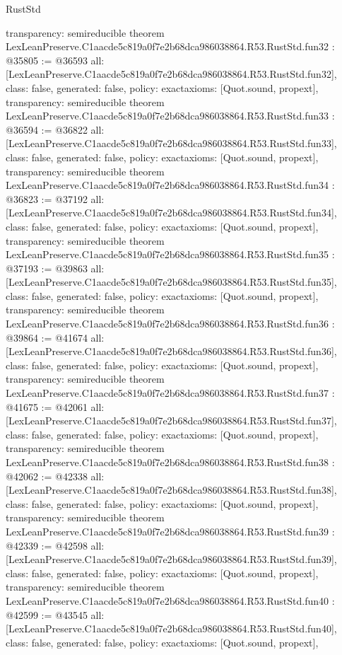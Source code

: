 \begin{lexlean}{RustStd}
\begin{coremodule}
{  transparency: semireducible
}
theorem LexLeanPreserve.C1aacde5c819a0f7e2b68dca986038864.R53.RustStd.fun32 : @35805 := @36593 {
  all: [LexLeanPreserve.C1aacde5c819a0f7e2b68dca986038864.R53.RustStd.fun32],
  class: false,
  generated: false,
  policy: exact{axioms: [Quot.sound, propext]},
  transparency: semireducible
}
theorem LexLeanPreserve.C1aacde5c819a0f7e2b68dca986038864.R53.RustStd.fun33 : @36594 := @36822 {
  all: [LexLeanPreserve.C1aacde5c819a0f7e2b68dca986038864.R53.RustStd.fun33],
  class: false,
  generated: false,
  policy: exact{axioms: [Quot.sound, propext]},
  transparency: semireducible
}
theorem LexLeanPreserve.C1aacde5c819a0f7e2b68dca986038864.R53.RustStd.fun34 : @36823 := @37192 {
  all: [LexLeanPreserve.C1aacde5c819a0f7e2b68dca986038864.R53.RustStd.fun34],
  class: false,
  generated: false,
  policy: exact{axioms: [Quot.sound, propext]},
  transparency: semireducible
}
theorem LexLeanPreserve.C1aacde5c819a0f7e2b68dca986038864.R53.RustStd.fun35 : @37193 := @39863 {
  all: [LexLeanPreserve.C1aacde5c819a0f7e2b68dca986038864.R53.RustStd.fun35],
  class: false,
  generated: false,
  policy: exact{axioms: [Quot.sound, propext]},
  transparency: semireducible
}
theorem LexLeanPreserve.C1aacde5c819a0f7e2b68dca986038864.R53.RustStd.fun36 : @39864 := @41674 {
  all: [LexLeanPreserve.C1aacde5c819a0f7e2b68dca986038864.R53.RustStd.fun36],
  class: false,
  generated: false,
  policy: exact{axioms: [Quot.sound, propext]},
  transparency: semireducible
}
theorem LexLeanPreserve.C1aacde5c819a0f7e2b68dca986038864.R53.RustStd.fun37 : @41675 := @42061 {
  all: [LexLeanPreserve.C1aacde5c819a0f7e2b68dca986038864.R53.RustStd.fun37],
  class: false,
  generated: false,
  policy: exact{axioms: [Quot.sound, propext]},
  transparency: semireducible
}
theorem LexLeanPreserve.C1aacde5c819a0f7e2b68dca986038864.R53.RustStd.fun38 : @42062 := @42338 {
  all: [LexLeanPreserve.C1aacde5c819a0f7e2b68dca986038864.R53.RustStd.fun38],
  class: false,
  generated: false,
  policy: exact{axioms: [Quot.sound, propext]},
  transparency: semireducible
}
theorem LexLeanPreserve.C1aacde5c819a0f7e2b68dca986038864.R53.RustStd.fun39 : @42339 := @42598 {
  all: [LexLeanPreserve.C1aacde5c819a0f7e2b68dca986038864.R53.RustStd.fun39],
  class: false,
  generated: false,
  policy: exact{axioms: [Quot.sound, propext]},
  transparency: semireducible
}
theorem LexLeanPreserve.C1aacde5c819a0f7e2b68dca986038864.R53.RustStd.fun40 : @42599 := @43545 {
  all: [LexLeanPreserve.C1aacde5c819a0f7e2b68dca986038864.R53.RustStd.fun40],
  class: false,
  generated: false,
  policy: exact{axioms: [Quot.sound, propext]},
}
\end{coremodule}
\end{lexlean}
